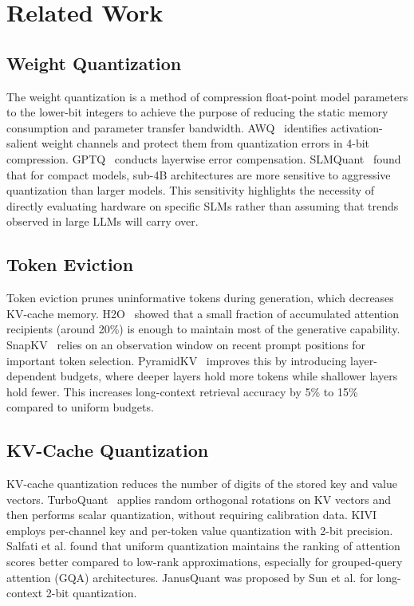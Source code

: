\documentclass[sigconf,nonacm]{acmart}
\begin{document}
\section{Related Work}

\subsection{Weight Quantization}
The weight quantization is a method of compression float-point model parameters to the lower-bit integers to achieve the purpose of reducing the static memory consumption and parameter transfer bandwidth. AWQ~\cite{lin_awq_2025} identifies activation-salient weight channels and protect them from quantization errors in 4-bit compression. GPTQ~\cite{frantar_gptq_2023} conducts layerwise error compensation. SLMQuant~\cite{wang_slmquant_2025} found that for compact models, sub-4B architectures are more sensitive to aggressive quantization than larger models. This sensitivity highlights the necessity of directly evaluating hardware on specific SLMs rather than assuming that trends observed in large LLMs will carry over.

\subsection{Token Eviction}
Token eviction prunes uninformative tokens during generation, which decreases KV-cache memory. H2O~\cite{zhang_h2o_2023} showed that a small fraction of accumulated attention recipients (around 20\%) is enough to maintain most of the generative capability. SnapKV~\cite{li_snapkv_2024} relies on an observation window on recent prompt positions for important token selection. PyramidKV~\cite{cai_pyramidkv_2025} improves this by introducing layer-dependent budgets, where deeper layers hold more tokens while shallower layers hold fewer. This increases long-context retrieval accuracy by 5\% to 15\% compared to uniform budgets.

\subsection{KV-Cache Quantization}
KV-cache quantization reduces the number of digits of the stored key and value vectors. TurboQuant~\cite{zandieh2026turboquant} applies random orthogonal rotations on KV vectors and then performs scalar quantization, without requiring calibration data. KIVI~\cite{liu_kivi_2023} employs per-channel key and per-token value quantization with 2-bit precision. Salfati et al. \cite{salfati_quantization_2026} found that uniform quantization maintains the ranking of attention scores better compared to low-rank approximations, especially for grouped-query attention (GQA) architectures. JanusQuant was proposed by Sun et al. \cite{sun2026janusquant} for long-context 2-bit quantization.
\end{document}
